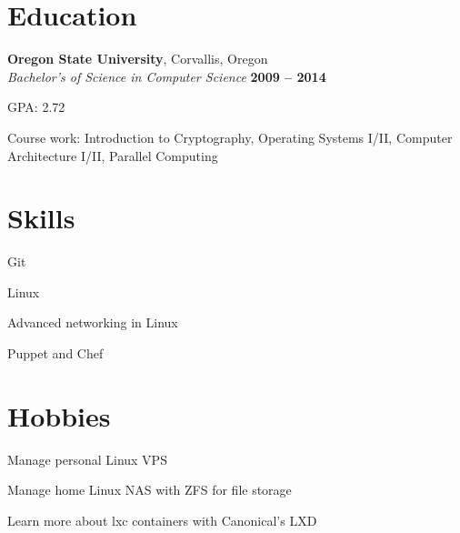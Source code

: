 \documentclass[margin,line]{resume}
\begin{document}
\begin{resume}
    \section{\mysidestyle Education}

    \textbf{Oregon State University}, Corvallis, Oregon \vspace{2mm}\\\vspace{1mm}%
    \textsl{Bachelor's of Science in Computer Science} \hfill \textbf{ 2009 -- 2014}\vspace{-3mm}\\\vspace{-1mm}%
    \begin{list2}
        \item GPA:  2.72
        \item Course work: Introduction to Cryptography, Operating Systems I/II,
              Computer Architecture I/II, Parallel Computing\\
    \end{list2}\vspace{-1.5mm}


    \section{\mysidestyle Skills}
    \begin{list2}
    \item Git
    \item Linux
    \item Advanced networking in Linux
    \item Puppet and Chef\\
    \end{list2}\vspace{-1.5mm}

    \section{\mysidestyle Hobbies}
    \begin{list2}
    \item Manage personal Linux VPS
    \item Manage home Linux NAS with ZFS for file storage
    \item Learn more about lxc containers with Canonical's LXD\\
    \end{list2}\vspace{-1.5mm}



\end{resume}
\end{document}
